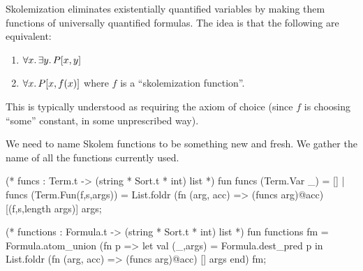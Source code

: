 \begin{node}
Skolemization eliminates existentially quantified variables by making
them functions of universally quantified formulas. The idea is that
the following are equivalent:
\begin{enumerate}
\item $\forall x\ldotp\exists y\ldotp P[x,y]$
\item $\forall x\ldotp P[x, f(x)]$ where $f$ is a ``skolemization function''.
\end{enumerate}
This is typically understood as requiring the axiom of choice (since
$f$ is choosing ``some'' constant, in some unprescribed way).
\end{node}

\begin{node}
We need to name Skolem functions to be something new and fresh. We
gather the name of all the functions currently used.
\end{node}

\nwenddocs{}\endmoddef\nwstartdeflinemarkup{}\nwenddeflinemarkup
(* funcs : Term.t -> (string * Sort.t * int) list *)
fun funcs (Term.Var _) = []
  | funcs (Term.Fun(f,s,args)) =
      List.foldr (fn (arg, acc) =>
                   (funcs arg)@acc)
                 [(f,s,length args)]
                 args;

(* functions : Formula.t -> (string * Sort.t * int) list *)
fun functions fm =
  Formula.atom_union
    (fn p => let val (_,args) = Formula.dest_pred p
             in List.foldr (fn (arg, acc) => (funcs arg)@acc)
                           []
                           args
             end)
    fm;
\nwendcode{}\nwdocspar

